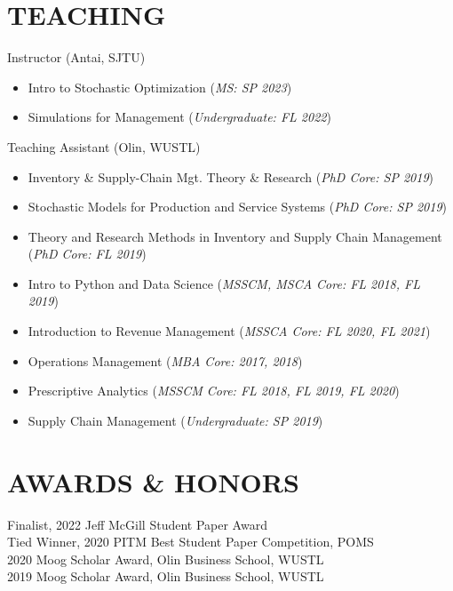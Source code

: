 \documentclass[margin]{res} %
\begin{document}
\begin{resume}
\section{TEACHING}
Instructor (Antai, SJTU)
\begin{itemize}
    \item Intro to Stochastic Optimization ({\it MS: SP 2023})
    \item Simulations for Management ({\it Undergraduate: FL 2022})
\end{itemize}
Teaching Assistant (Olin, WUSTL)
\begin{itemize}
    \item Inventory \& Supply-Chain Mgt. Theory \& Research ({\it PhD Core: SP 2019})
    \item Stochastic Models for Production and Service Systems ({\it PhD Core: SP 2019})
    \item Theory and Research Methods in Inventory and Supply Chain Management ({\it PhD Core: FL 2019})
    \item Intro to Python and Data Science ({\it MSSCM, MSCA Core: FL 2018, FL 2019})		
    \item Introduction to Revenue Management ({\it MSSCA Core: FL 2020, FL 2021})
    \item Operations Management ({\it MBA Core: 2017, 2018})
    \item Prescriptive Analytics ({\it MSSCM Core: FL 2018, FL 2019, FL 2020})		
    \item Supply Chain Management ({\it Undergraduate: SP 2019})
\end{itemize}


\section{AWARDS \& HONORS} 
    Finalist, 2022 Jeff McGill Student Paper Award\\
    Tied Winner, 2020 PITM Best Student Paper Competition, POMS\\
    2020 Moog Scholar Award, Olin Business School, WUSTL\\
    2019 Moog Scholar Award, Olin Business School, WUSTL\\


\end{resume}
\end{document}
